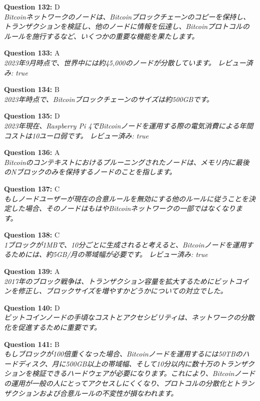 \documentclass[12pt,a4paper]{article}
\begin{document}
\begin{enumerate}
{{{{{{{{\item \textbf{Question 132:} D
\\ \textit{Bitcoinネットワークのノードは、Bitcoinブロックチェーンのコピーを保持し、トランザクションを検証し、他のノードに情報を伝達し、Bitcoinプロトコルのルールを施行するなど、いくつかの重要な機能を果たします。}

\item \textbf{Question 133:} A
\\ \textit{2023年9月時点で、世界中には約45,000のノードが分散しています。 レビュー済み: true}

\item \textbf{Question 134:} B
\\ \textit{2023年時点で、Bitcoinブロックチェーンのサイズは約500GBです。}

\item \textbf{Question 135:} D
\\ \textit{2023年現在、Raspberry Pi 4でBitcoinノードを運用する際の電気消費による年間コストは10ユーロ弱です。
レビュー済み: true}

\item \textbf{Question 136:} A
\\ \textit{Bitcoinのコンテキストにおけるプルーニングされたノードは、メモリ内に最後のNブロックのみを保持するノードのことを指します。}

\item \textbf{Question 137:} C
\\ \textit{もしノードユーザーが現在の合意ルールを無効にする他のルールに従うことを決定した場合、そのノードはもはやBitcoinネットワークの一部ではなくなります。}

\item \textbf{Question 138:} C
\\ \textit{1ブロックが1MBで、10分ごとに生成されると考えると、Bitcoinノードを運用するためには、約5GB/月の帯域幅が必要です。 レビュー済み: true}

\item \textbf{Question 139:} A
\\ \textit{2017年のブロック戦争は、トランザクション容量を拡大するためにビットコインを修正し、ブロックサイズを増やすかどうかについての対立でした。}

\item \textbf{Question 140:} D
\\ \textit{ビットコインノードの手頃なコストとアクセシビリティは、ネットワークの分散化を促進するために重要です。}

\item \textbf{Question 141:} B
\\ \textit{もしブロックが100倍重くなった場合、Bitcoinノードを運用するには50TBのハードディスク、月に500GB以上の帯域幅、そして10分以内に数十万のトランザクションを検証できるハードウェアが必要になります。これにより、Bitcoinノードの運用が一般の人にとってアクセスしにくくなり、プロトコルの分散化とトランザクションおよび合意ルールの不変性が損なわれます。}

}}}}}}}}
\end{enumerate}
\end{document}
